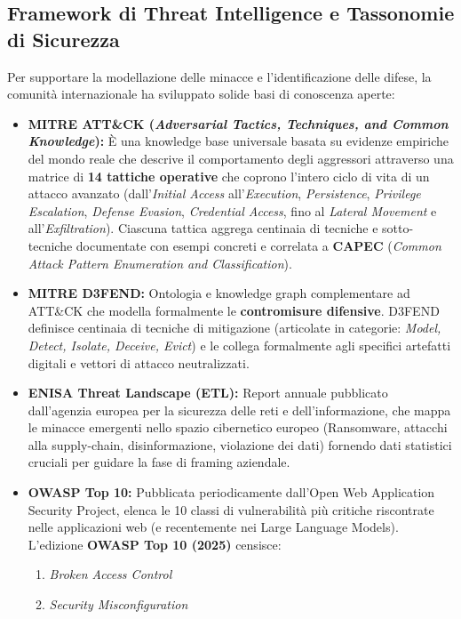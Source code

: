 \documentclass[../../main.tex]{subfiles}
\begin{document}
\subsection{Framework di Threat Intelligence e Tassonomie di Sicurezza}
Per supportare la modellazione delle minacce e l'identificazione delle difese, la comunità internazionale ha sviluppato solide basi di conoscenza aperte:
\begin{itemize}
    \item \textbf{MITRE ATT\&CK (\textit{Adversarial Tactics, Techniques, and Common Knowledge}):} È una knowledge base universale basata su evidenze empiriche del mondo reale che descrive il comportamento degli aggressori attraverso una matrice di \textbf{14 tattiche operative} che coprono l'intero ciclo di vita di un attacco avanzato (dall'\textit{Initial Access} all'\textit{Execution}, \textit{Persistence}, \textit{Privilege Escalation}, \textit{Defense Evasion}, \textit{Credential Access}, fino al \textit{Lateral Movement} e all'\textit{Exfiltration}). Ciascuna tattica aggrega centinaia di tecniche e sotto-tecniche documentate con esempi concreti e correlata a \textbf{CAPEC} (\textit{Common Attack Pattern Enumeration and Classification}).
    \item \textbf{MITRE D3FEND:} Ontologia e knowledge graph complementare ad ATT\&CK che modella formalmente le \textbf{contromisure difensive}. D3FEND definisce centinaia di tecniche di mitigazione (articolate in categorie: \textit{Model, Detect, Isolate, Deceive, Evict}) e le collega formalmente agli specifici artefatti digitali e vettori di attacco neutralizzati.
    \item \textbf{ENISA Threat Landscape (ETL):} Report annuale pubblicato dall'agenzia europea per la sicurezza delle reti e dell'informazione, che mappa le minacce emergenti nello spazio cibernetico europeo (Ransomware, attacchi alla supply-chain, disinformazione, violazione dei dati) fornendo dati statistici cruciali per guidare la fase di framing aziendale.
    \item \textbf{OWASP Top 10:} Pubblicata periodicamente dall'Open Web Application Security Project, elenca le 10 classi di vulnerabilità più critiche riscontrate nelle applicazioni web (e recentemente nei Large Language Models). L'edizione \textbf{OWASP Top 10 (2025)} censisce:
    \begin{enumerate}[label={A\arabic*:{2025} --}]
        \item \textit{Broken Access Control}
        \item \textit{Security Misconfiguration}

\end{enumerate}
\end{itemize}
\end{document}
